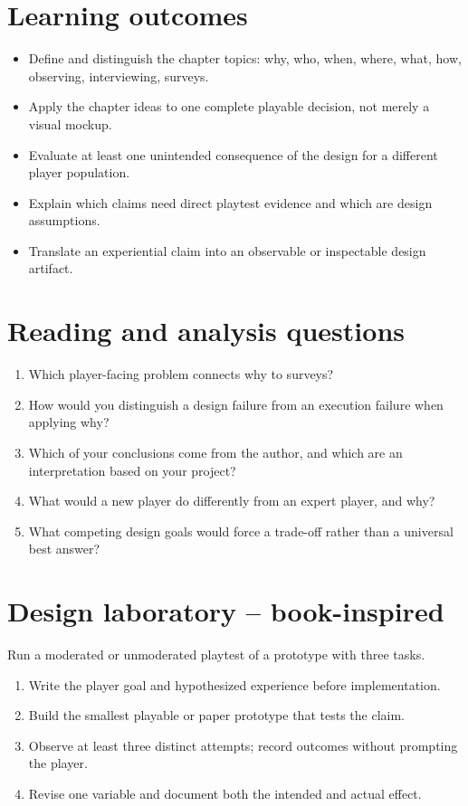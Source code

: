 \documentclass[11pt]{article}
\begin{document}
\section{Learning outcomes}
\begin{itemize}
\item Define and distinguish the chapter topics: why, who, when, where, what, how, observing, interviewing, surveys.
\item Apply the chapter ideas to one complete playable decision, not merely a visual mockup.
\item Evaluate at least one unintended consequence of the design for a different player population.
\item Explain which claims need direct playtest evidence and which are design assumptions.
\item Translate an experiential claim into an observable or inspectable design artifact.
\end{itemize}

\section{Reading and analysis questions}
\begin{enumerate}
\item Which player-facing problem connects why to surveys?
\item How would you distinguish a design failure from an execution failure when applying why?
\item Which of your conclusions come from the author, and which are an interpretation based on your project?
\item What would a new player do differently from an expert player, and why?
\item What competing design goals would force a trade-off rather than a universal best answer?
\end{enumerate}

\section{Design laboratory -- book-inspired}
Run a moderated or unmoderated playtest of a prototype with three tasks.

\begin{enumerate}
\item Write the player goal and hypothesized experience before implementation.
\item Build the smallest playable or paper prototype that tests the claim.
\item Observe at least three distinct attempts; record outcomes without prompting the player.
\item Revise one variable and document both the intended and actual effect.
\end{enumerate}
\end{document}
